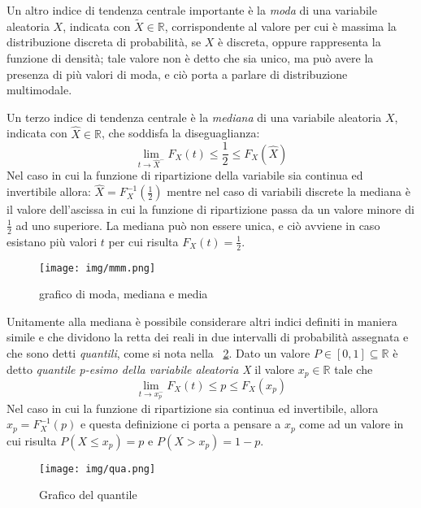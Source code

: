 \documentclass[a4paper,12pt, oneside]{book}
\newcommand{\numberset}{\mathbb}
\newcommand{\R}{\numberset{R}}
\begin{document}
Un altro indice di tendenza centrale importante è la \emph{moda} di una variabile aleatoria $X$, indicata
con $\widetilde{X} \in \R$, corrispondente al valore per cui è massima la distribuzione discreta di
probabilità, se $X$ è discreta, oppure rappresenta la funzione di densità; tale valore non è detto che sia
unico, ma può avere la presenza di più valori di moda, e ciò porta a parlare di distribuzione multimodale.

Un terzo indice di tendenza centrale è la \emph{mediana}  di una variabile aleatoria $X$, 
indicata con $\hat{X} \in \R$, che soddisfa la diseguaglianza:
\[ \lim_{t \to \hat{X}^-} F_X(t) \leq \frac{1}{2} \leq F_X(\hat{X})\]
Nel caso in cui la funzione di ripartizione della variabile sia continua ed invertibile allora:
$\hat{X}=F_X^{-1}(\frac{1}{2})$ mentre nel caso di variabili discrete la mediana è il valore dell'ascissa
in cui la funzione di ripartizione passa da un valore minore di $\frac{1}{2}$ ad uno superiore.\newline
La mediana può non essere unica, e ciò avviene in caso esistano più valori $t$ per cui risulta $F_X(t) = \frac{1}{2}$.

\begin{figure}
    \centering
    \caption{grafico di moda, mediana e media}
    \label{fig:centralValue}
    \texttt{[image: img/mmm.png]}
\end{figure}
Unitamente alla mediana è possibile considerare altri indici definiti in maniera simile e che dividono
la retta dei reali in due intervalli di probabilità assegnata e che sono detti \emph{quantili}, come si nota
nella \figurename~\ref{fig:quantile}.
Dato un valore $P \in [0,1] \subseteq \R$ è detto \emph{quantile p-esimo della variabile aleatoria X} il valore
$x_p \in \R$ tale che
\[ \lim_{t \to x_p^{-}} F_X(t) \leq p \leq F_X(x_p)\]
Nel caso in cui la funzione di ripartizione sia continua ed invertibile, allora $x_p = F_X^{-1}(p)$
e questa definizione ci porta a pensare a $x_p$ come ad un valore in cui risulta 
$P(X \leq x_p) = p$ e $P(X > x_p) = 1-p$.

\begin{figure}
    \centering
    \caption{Grafico del quantile}
    \label{fig:quantile}
    \texttt{[image: img/qua.png]}
\end{figure}
\end{document}

